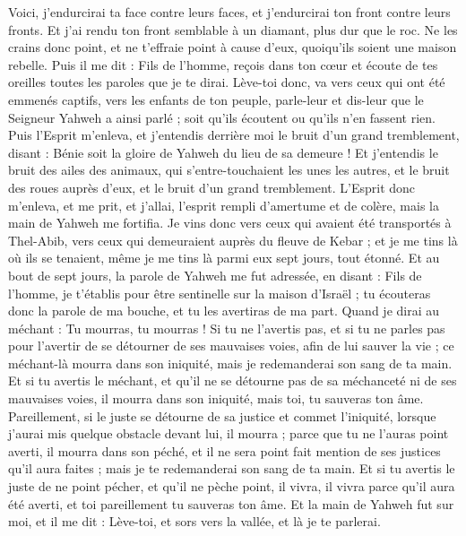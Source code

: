 \begin{multicols}{2}
Voici, j'endurcirai ta face contre leurs faces, et j'endurcirai ton front contre leurs fronts.
Et j'ai rendu ton front semblable à un diamant, plus dur que le roc. Ne les crains donc point, et ne t'effraie point à cause d'eux, quoiqu'ils soient une maison rebelle.
Puis il me dit : Fils de l'homme, reçois dans ton cœur et écoute de tes oreilles toutes les paroles que je te dirai.
Lève-toi donc, va vers ceux qui ont été emmenés captifs, vers les enfants de ton peuple, parle-leur et dis-leur que le Seigneur Yahweh a ainsi parlé ; soit qu'ils écoutent ou qu'ils n'en fassent rien.
Puis l'Esprit m'enleva, et j'entendis derrière moi le bruit d'un grand tremblement, disant : Bénie soit la gloire de Yahweh du lieu de sa demeure !
Et j'entendis le bruit des ailes des animaux, qui s'entre-touchaient les unes les autres, et le bruit des roues auprès d'eux, et le bruit d'un grand tremblement.
L'Esprit donc m'enleva, et me prit, et j'allai, l'esprit rempli d'amertume et de colère, mais la main de Yahweh me fortifia.
Je vins donc vers ceux qui avaient été transportés à Thel-Abib, vers ceux qui demeuraient auprès du fleuve de Kebar ; et je me tins là où ils se tenaient, même je me tins là parmi eux sept jours, tout étonné.
Et au bout de sept jours, la parole de Yahweh me fut adressée, en disant :
Fils de l'homme, je t'établis pour être sentinelle sur la maison d'Israël ; tu écouteras donc la parole de ma bouche, et tu les avertiras de ma part.
Quand je dirai au méchant : Tu mourras, tu mourras ! Si tu ne l'avertis pas, et si tu ne parles pas pour l'avertir de se détourner de ses mauvaises voies, afin de lui sauver la vie ; ce méchant-là mourra dans son iniquité, mais je redemanderai son sang de ta main.
Et si tu avertis le méchant, et qu'il ne se détourne pas de sa méchanceté ni de ses mauvaises voies, il mourra dans son iniquité, mais toi, tu sauveras ton âme.
Pareillement, si le juste se détourne de sa justice et commet l'iniquité, lorsque j'aurai mis quelque obstacle devant lui, il mourra ; parce que tu ne l'auras point averti, il mourra dans son péché, et il ne sera point fait mention de ses justices qu'il aura faites ; mais je te redemanderai son sang de ta main.
Et si tu avertis le juste de ne point pécher, et qu'il ne pèche point, il vivra, il vivra parce qu'il aura été averti, et toi pareillement tu sauveras ton âme.
Et la main de Yahweh fut sur moi, et il me dit : Lève-toi, et sors vers la vallée, et là je te parlerai.

\end{multicols}
